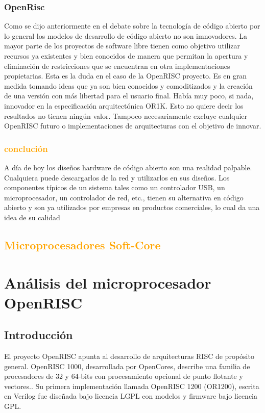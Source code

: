 \documentclass[a4paper,11pt]{article}
\begin{document}
		\subsection{OpenRisc}

Como se dijo anteriormente en el debate sobre la tecnología de código abierto por lo general los modelos de desarrollo de código abierto no son imnovadores.
 La mayor parte de los proyectos de software libre tienen como objetivo utilizar recursos ya existentes y bien conocidos de manera que permitan la apertura y eliminación de restricciones que se encuentran en otra implementaciones propietarias. Esta es la duda en el caso de la OpenRISC proyecto. Es en gran medida tomando ideas que ya son bien conocidos y comoditizados
y la creación de una versión con más libertad para el usuario final. Había muy poco, si
nada, innovador en la especificación arquitectónica OR1K. Esto no quiere decir
los resultados no tienen ningún valor. Tampoco necesariamente excluye cualquier OpenRISC futuro
o implementaciones de arquitecturas con el objetivo de innovar.

		\subsection{\textcolor{orange}{conclución}}

A día de hoy los diseños hardware de código abierto son una realidad palpable. Cualquiera puede descargarlos de la red y utilizarlos en sus diseños. Los componentes típicos de un sistema tales como un controlador USB, un microprocesador, un controlador de red, etc., tienen su alternativa en código abierto y son ya utilizados por empresas en productos comerciales, lo cual da una idea de su calidad



	\section{\textcolor{orange}{Microprocesadores Soft-Core}}
\chapter{Análisis del microprocesador OpenRISC}
	\section{Introducción}
	El proyecto OpenRISC apunta al desarrollo de arquitecturas RISC de propósito general. OpenRISC 1000, desarrollada por OpenCores, describe una
	familia de procesadores de 32 y 64-bits con procesamiento opcional de punto flotante y vectores.\cite{etiqueta_OR_01}. Su primera implementación
	llamada OpenRISC 1200 (OR1200), escrita en Verilog fue diseñada bajo licencia LGPL con modelos y firmware bajo licencia GPL. 
	
\end{document}
